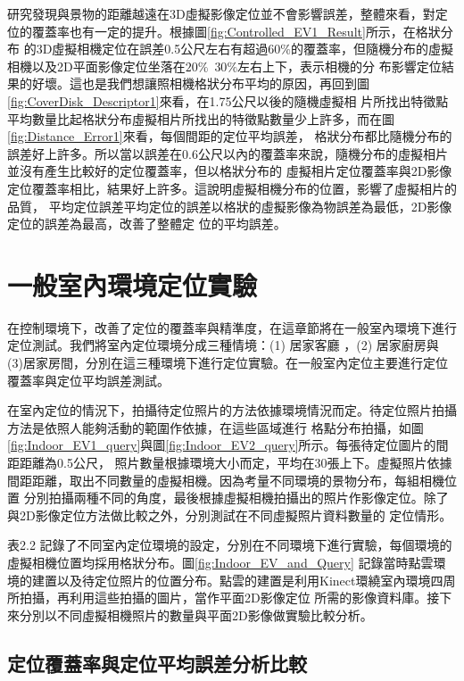 	研究發現與景物的距離越遠在3D虛擬影像定位並不會影響誤差，整體來看，對定位的覆蓋率也有一定的提升。根據圖\ref{fig:Controlled_EV1_Result}所示，在格狀分布
的3D虛擬相機定位在誤差0.5公尺左右有超過$60\%$的覆蓋率，但隨機分布的虛擬相機以及2D平面影像定位坐落在$20\%$~$30\%$左右上下，表示相機的分
布影響定位結果的好壞。這也是我們想讓照相機格狀分布平均的原因，再回到圖\ref{fig:CoverDisk_Descriptor1}來看，在1.75公尺以後的隨機虛擬相
片所找出特徵點平均數量比起格狀分布虛擬相片所找出的特徵點數量少上許多，而在圖\ref{fig:Distance_Error1}來看，每個間距的定位平均誤差，
格狀分布都比隨機分布的誤差好上許多。所以當以誤差在0.6公尺以內的覆蓋率來說，隨機分布的虛擬相片並沒有產生比較好的定位覆蓋率，但以格狀分布的
虛擬相片定位覆蓋率與2D影像定位覆蓋率相比，結果好上許多。這說明虛擬相機分布的位置，影響了虛擬相片的品質，
平均定位誤差平均定位的誤差以格狀的虛擬影像為物誤差為最低，2D影像定位的誤差為最高，改善了整體定
位的平均誤差。

\section{一般室內環境定位實驗}

	在控制環境下，改善了定位的覆蓋率與精準度，在這章節將在一般室內環境下進行定位測試。我們將室內定位環境分成三種情境：(1)
居家客廳 ，(2) 居家廚房與 (3)居家房間，分別在這三種環境下進行定位實驗。在一般室內定位主要進行定位覆蓋率與定位平均誤差測試。
	
	在室內定位的情況下，拍攝待定位照片的方法依據環境情況而定。待定位照片拍攝方法是依照人能夠活動的範圍作依據，在這些區域進行
格點分布拍攝，如圖\ref{fig:Indoor_EV1_query}與圖\ref{fig:Indoor_EV2_query}所示。每張待定位圖片的間距距離為0.5公尺，
照片數量根據環境大小而定，平均在30張上下。虛擬照片依據間距距離，取出不同數量的虛擬相機。因為考量不同環境的景物分布，每組相機位置
分別拍攝兩種不同的角度，最後根據虛擬相機拍攝出的照片作影像定位。除了與2D影像定位方法做比較之外，分別測試在不同虛擬照片資料數量的
定位情形。
		
	
	
	表2.2 記錄了不同室內定位環境的設定，分別在不同環境下進行實驗，每個環境的虛擬相機位置均採用格狀分布。圖\ref{fig:Indoor_EV_and_Query}
記錄當時點雲環境的建置以及待定位照片的位置分布。點雲的建置是利用Kinect環繞室內環境四周所拍攝，再利用這些拍攝的圖片，當作平面2D影像定位
所需的影像資料庫。接下來分別以不同虛擬相機照片的數量與平面2D影像做實驗比較分析。
	
\subsection{定位覆蓋率與定位平均誤差分析比較}


